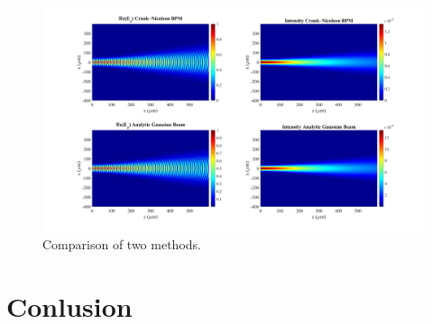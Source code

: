 \documentclass{article}
\begin{document}
	\begin{figure}[h!]
		\hspace{-30mm}
		\includegraphics[width=1.5\textwidth]{N1.jpg}
		\caption{\label{fig:Results}Comparison of two methods.}
	\end{figure}
	\section{Conlusion}
	
\end{document}
